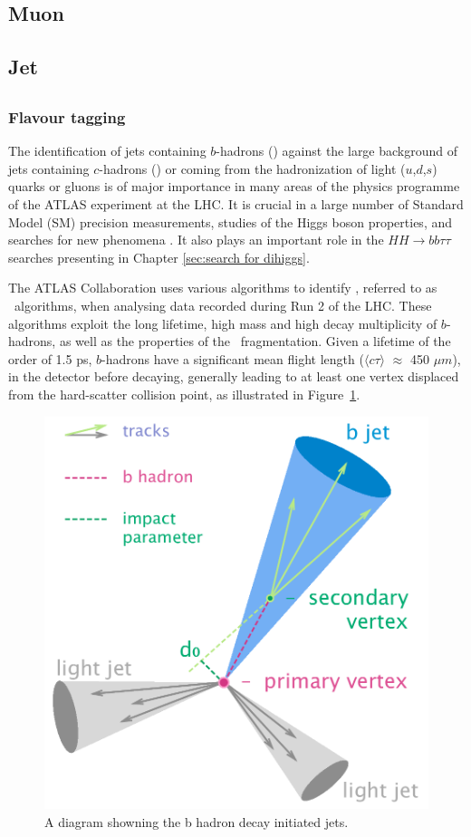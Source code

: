 \documentclass[letterpaper,12pt]{article}
\begin{document}
\subsection{Muon}
\subsection{Jet}
\subsection{\bjets}


\subsubsection{Flavour tagging}
\label{sec:Flavour tagging}

The identification of jets containing $b$-hadrons (\bjets) 
against the large background of jets containing $c$-hadrons 
(\cjets) or coming from the hadronization of light ($u$,$d$,$s$) 
quarks or gluons is of major importance in many areas of the 
physics programme of the ATLAS experiment at the LHC. 
It is crucial in a large number of Standard Model (SM) 
precision measurements, studies of the Higgs boson properties, and 
searches for new phenomena \cite{SUSY-2014-08, ATLAS-CONF-2018-043,Interpreting_Higgs_result}.
It also plays an important role in 
the $HH \to bb\tau\tau$ searches presenting in Chapter \ref{sec:search for dihiggs}. 


The ATLAS Collaboration uses various algorithms to identify 
\bjets \cite{PERF-2012-04}, referred to as \btagging\ algorithms, 
when analysing data recorded during Run 2 of the LHC. These 
algorithms exploit the long lifetime, high mass and high decay 
multiplicity of $b$-hadrons, as well as the properties of the \bquark\  
fragmentation. Given a lifetime of the order of 1.5 ps, $b$-hadrons have a 
significant mean flight length ($\langle c\tau \rangle$ $\approx$ 450 $\mu m$), 
in the detector before decaying, generally leading to at least one vertex 
displaced from the hard-scatter collision point, as illustrated in Figure~\ref{fig:b-jet-decay}.

\begin{figure}[]
	\begin{centering}	
	\includegraphics[width=.4\textwidth]{FTAG_plots/B-tagging_diagram.png}
	\caption{A diagram showning the b hadron decay initiated jets. }
	\label{fig:b-jet-decay}
	\end{centering}
\end{figure}
\end{document}
